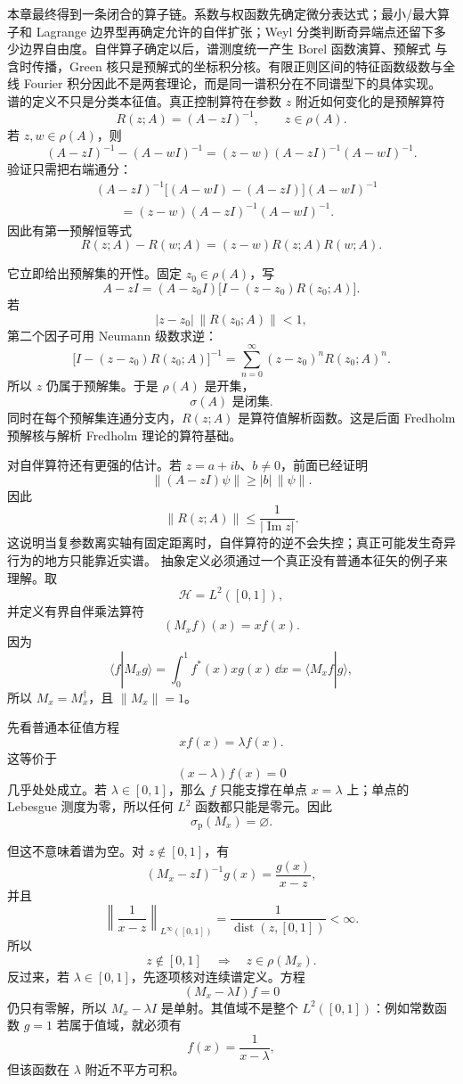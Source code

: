本章最终得到一条闭合的算子链。系数与权函数先确定微分表达式；最小/最大算子和 Lagrange 边界型再确定允许的自伴扩张；Weyl 分类判断奇异端点还留下多少边界自由度。自伴算子确定以后，谱测度统一产生 Borel 函数演算、预解式 与含时传播，Green 核只是预解式的坐标积分核。有限正则区间的特征函数级数与全线 Fourier 积分因此不是两套理论，而是同一谱积分在不同谱型下的具体实现。
谱的定义不只是分类本征值。真正控制算符在参数 $z$ 附近如何变化的是预解算符
\[
R(z;A)=(A-zI)^{-1},
\qquad z\in\rho(A).
\]
若 $z,w\in\rho(A)$，则
\[
(A-zI)^{-1}-(A-wI)^{-1}
=(z-w)(A-zI)^{-1}(A-wI)^{-1}.
\]
验证只需把右端通分：
\[
\begin{aligned}
&(A-zI)^{-1}\bigl[(A-wI)-(A-zI)\bigr](A-wI)^{-1}\\
&\qquad=(z-w)(A-zI)^{-1}(A-wI)^{-1}.
\end{aligned}
\]
因此有第一预解恒等式
\begin{equation*}{
R(z;A)-R(w;A)=(z-w)R(z;A)R(w;A)
}.\end{equation*}

它立即给出预解集的开性。固定 $z_0\in\rho(A)$，写
\[
A-zI=(A-z_0I)\bigl[I-(z-z_0)R(z_0;A)\bigr].
\]
若
\[
|z-z_0|\,\|R(z_0;A)\|<1,
\]
第二个因子可用 Neumann 级数求逆：
\[
\bigl[I-(z-z_0)R(z_0;A)\bigr]^{-1}
=\sum_{n=0}^\infty (z-z_0)^nR(z_0;A)^n.
\]
所以 $z$ 仍属于预解集。于是 $\rho(A)$ 是开集，
\[
{\sigma(A)\text{ 是闭集}.}
\]
同时在每个预解集连通分支内，$R(z;A)$ 是算符值解析函数。这是后面 Fredholm 预解核与解析 Fredholm 理论的算符基础。

对自伴算符还有更强的估计。若 $z=a+ib$、$b\neq0$，前面已经证明
\[
\|(A-zI)\psi\|\ge |b|\,\|\psi\|.
\]
因此
\begin{equation*}{
\|R(z;A)\|\le \frac1{|\operatorname{Im}z|}
}.\end{equation*}
这说明当复参数离实轴有固定距离时，自伴算符的逆不会失控；真正可能发生奇异行为的地方只能靠近实谱。
抽象定义必须通过一个真正没有普通本征矢的例子来理解。取
\[
\mathcal H=L^2([0,1]),
\]
并定义有界自伴乘法算符
\[
(M_xf)(x)=x f(x).
\]
因为
\[
\langle f|M_xg\rangle
=\int_0^1 f^*(x)xg(x)\,\dd x
=\langle M_xf|g\rangle,
\]
所以 $M_x=M_x^\dagger$，且 $\|M_x\|=1$。

先看普通本征值方程
\[
x f(x)=\lambda f(x).
\]
这等价于
\[
(x-\lambda)f(x)=0
\]
几乎处处成立。若 $\lambda\in[0,1]$，那么 $f$ 只能支撑在单点 $x=\lambda$ 上；单点的 Lebesgue 测度为零，所以任何 $L^2$ 函数都只能是零元。因此
\[
\sigma_{\mathrm p}(M_x)=\varnothing.
\]

但这不意味着谱为空。对 $z\notin[0,1]$，有
\[
(M_x-zI)^{-1}g(x)=\frac{g(x)}{x-z},
\]
并且
\[
\left\|\frac1{x-z}\right\|_{L^\infty([0,1])}
=\frac1{\operatorname{dist}(z,[0,1])}<\infty.
\]
所以
\[
z\notin[0,1]\quad\Longrightarrow\quad z\in\rho(M_x).
\]
反过来，若 $\lambda\in[0,1]$，先逐项核对连续谱定义。方程
\[
(M_x-\lambda I)f=0
\]
仍只有零解，所以 $M_x-\lambda I$ 是单射。其值域不是整个 $L^2([0,1])$：例如常数函数 $g=1$ 若属于值域，就必须有
\[
f(x)=\frac{1}{x-\lambda},
\]
但该函数在 $\lambda$ 附近不平方可积。

